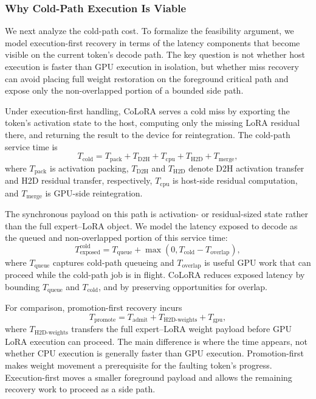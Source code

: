 \documentclass[sigplan,anonymous,review,10pt]{acmart}
\begin{document}
\subsubsection{Why Cold-Path Execution Is Viable} \mbox{}
\label{subsec:analytical-formulation}

We next analyze the cold-path cost. To formalize the feasibility argument, we model execution-first recovery in terms of the latency components that become visible on the current token's decode path. The key question is not whether host execution is faster than GPU execution in isolation, but whether miss recovery can avoid placing full weight restoration on the foreground critical path and expose only the non-overlapped portion of a bounded side path. 

Under execution-first handling, CoLoRA serves a cold miss by exporting the token's activation state to the host, computing only the missing LoRA residual there, and returning the result to the device for reintegration. The cold-path service time is
\begin{equation}
T_{\text{cold}} = T_{\text{pack}} + T_{\text{D2H}} + T_{\text{cpu}} + T_{\text{H2D}} + T_{\text{merge}},
\end{equation}
where $T_{\text{pack}}$ is activation packing, $T_{\text{D2H}}$ and $T_{\text{H2D}}$ denote D2H activation transfer and H2D residual transfer, respectively, $T_{\text{cpu}}$ is host-side residual computation, and $T_{\text{merge}}$ is GPU-side reintegration.

The synchronous payload on this path is activation- or residual-sized state rather than the full expert--LoRA object. We model the latency exposed to decode as the queued and non-overlapped portion of this service time:
\begin{equation}
T^{\text{cold}}_{\text{exposed}} = T_{\text{queue}} + \max(0, T_{\text{cold}} - T_{\text{overlap}}),
\end{equation}
where $T_{\text{queue}}$ captures cold-path queueing and $T_{\text{overlap}}$ is useful GPU work that can proceed while the cold-path job is in flight. CoLoRA reduces exposed latency by bounding $T_{\text{queue}}$ and $T_{\text{cold}}$, and by preserving opportunities for overlap.

For comparison, promotion-first recovery incurs
\begin{equation}
T_{\text{promote}} = T_{\text{admit}} + T_{\text{H2D-weights}} + T_{\text{gpu}},
\end{equation}
where $T_{\text{H2D-weights}}$ transfers the full expert--LoRA weight payload before GPU LoRA execution can proceed. The main difference is where the time appears, not whether CPU execution is generally faster than GPU execution. Promotion-first makes weight movement a prerequisite for the faulting token's progress. Execution-first moves a smaller foreground payload and allows the remaining recovery work to proceed as a side path.
\end{document}
